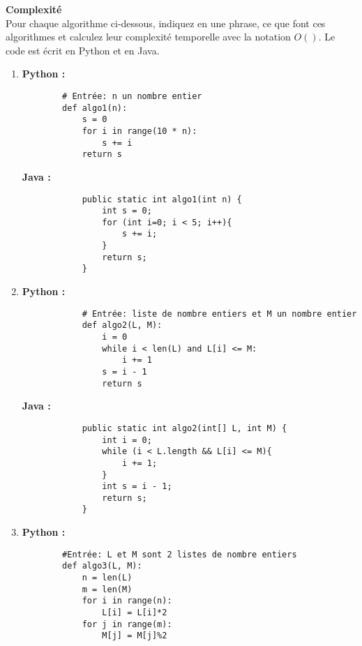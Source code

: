 \begin{Exercice}[20 minutes] \textbf{Complexité} \\
    Pour chaque algorithme ci-dessous, indiquez en une phrase, ce que font ces algorithmes et calculez leur complexité temporelle avec la notation $O( )$. Le code est écrit en Python et en Java.
    \begin{enumerate}
        \item 
        \textbf{Python :}
        \begin{verbatim}
        # Entrée: n un nombre entier
        def algo1(n):
            s = 0
            for i in range(10 * n):
                s += i
            return s
        \end{verbatim}
        
        \textbf{Java :}
        \begin{verbatim}
            public static int algo1(int n) {
                int s = 0;
                for (int i=0; i < 5; i++){
                    s += i;
                }
                return s;
            }
        \end{verbatim}
        
        \item \textbf{Python :}
        \begin{verbatim}
            # Entrée: liste de nombre entiers et M un nombre entier
            def algo2(L, M):
                i = 0
                while i < len(L) and L[i] <= M:
                    i += 1
                s = i - 1
                return s
        \end{verbatim}
        
        \textbf{Java :}
        \begin{verbatim}
            public static int algo2(int[] L, int M) {
                int i = 0;
                while (i < L.length && L[i] <= M){
                    i += 1;
                }
                int s = i - 1;
                return s;
            }
        \end{verbatim}
        
        \item \textbf{Python :}
        \begin{verbatim}
        #Entrée: L et M sont 2 listes de nombre entiers
        def algo3(L, M):
            n = len(L)
            m = len(M)
            for i in range(n):
                L[i] = L[i]*2
            for j in range(m):
                M[j] = M[j]%2
        \end{verbatim}
        

\end{enumerate}
\end{Exercice}
